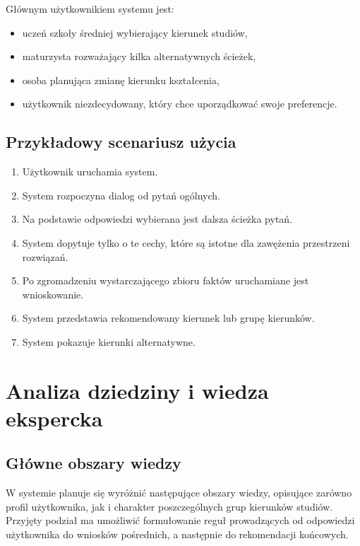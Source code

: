 \documentclass[12pt,a4paper,oneside]{article}
\begin{document}
Głównym użytkownikiem systemu jest:
\begin{itemize}[leftmargin=1.2cm]
    \item uczeń szkoły średniej wybierający kierunek studiów,
    \item maturzysta rozważający kilka alternatywnych ścieżek,
    \item osoba planująca zmianę kierunku kształcenia,
    \item użytkownik niezdecydowany, który chce uporządkować swoje preferencje.
\end{itemize}

\subsection{Przykładowy scenariusz użycia}

\begin{enumerate}[leftmargin=1.2cm]
    \item Użytkownik uruchamia system.
    \item System rozpoczyna dialog od pytań ogólnych.
    \item Na podstawie odpowiedzi wybierana jest dalsza ścieżka pytań.
    \item System dopytuje tylko o te cechy, które są istotne dla zawężenia przestrzeni rozwiązań.
    \item Po zgromadzeniu wystarczającego zbioru faktów uruchamiane jest wnioskowanie.
    \item System przedstawia rekomendowany kierunek lub grupę kierunków.
    \item System pokazuje kierunki alternatywne.
\end{enumerate}

\newpage
\section{Analiza dziedziny i wiedza ekspercka}

\subsection{Główne obszary wiedzy}

W systemie planuje się wyróżnić następujące obszary wiedzy, opisujące zarówno profil użytkownika, jak i charakter poszczególnych grup kierunków studiów. Przyjęty podział ma umożliwić formułowanie reguł prowadzących od odpowiedzi użytkownika do wniosków pośrednich, a następnie do rekomendacji końcowych.
\end{document}
